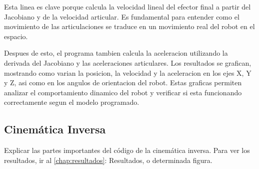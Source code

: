Esta linea es clave porque calcula la velocidad lineal del efector final a partir del Jacobiano y de la velocidad articular. Es fundamental para entender como el movimiento de las articulaciones se traduce en un movimiento real del robot en el espacio.

Despues de esto, el programa tambien calcula la aceleracion utilizando la derivada del Jacobiano y las aceleraciones articulares. Los resultados se grafican, mostrando como varian la posicion, la velocidad y la aceleracion en los ejes X, Y y Z, asi como en los angulos de orientacion del robot. Estas graficas permiten analizar el comportamiento dinamico del robot y verificar si esta funcionando correctamente segun el modelo programado.

\subsection{Cinemática Inversa}
Explicar las partes importantes del código de la cinemática inversa.
Para ver los resultados, ir al \autoref{chap:resultados}: Resultados, o determinada figura.